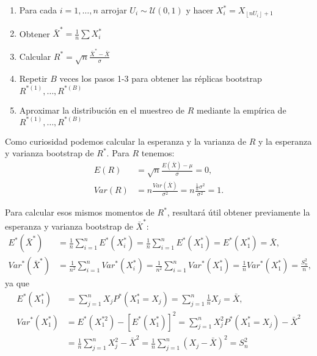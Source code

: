 \documentclass[]{book}
\theoremstyle{break}
\theoremstyle{definition}
\theoremstyle{definition}
\theoremstyle{definition}
\theoremstyle{remark}
\begin{document}
\begin{enumerate}
\def\labelenumi{\arabic{enumi}.}
\item
  Para cada \(i=1,\ldots ,n\) arrojar
  \(U_i\sim \mathcal{U}\left( 0,1 \right)\) y hacer
  \(X_i^{\ast}=X_{\left\lfloor nU_i\right\rfloor +1}\)
\item
  Obtener \(\bar{X}^{\ast}=\frac{1}{n}\sum X_i^{\ast}\)
\item
  Calcular \(R^{\ast}=\sqrt{n}\frac{\bar{X}^{\ast}-\bar{X}}{ \sigma }\)
\item
  Repetir \(B\) veces los pasos 1-3 para obtener las réplicas bootstrap
  \(R^{\ast (1)}, \ldots, R^{\ast (B)}\)
\item
  Aproximar la distribución en el muestreo de \(R\) mediante la empírica
  de \(R^{\ast (1)}, \ldots, R^{\ast (B)}\)
\end{enumerate}

Como curiosidad podemos calcular la esperanza y la varianza de \(R\) y
la esperanza y varianza bootstrap de \(R^{\ast}\). Para \(R\) tenemos:
\[\begin{aligned}
E\left( R \right) &=\sqrt{n}\frac{E\left( \bar{X} \right) -\mu }{\sigma }
=0, \\
Var\left( R \right) &=n\frac{Var\left( \bar{X} \right)}{\sigma^2}=n
\frac{\frac{1}{n}\sigma^2}{\sigma^2}=1.
\end{aligned}\]

Para calcular esos mismos momentos de \(R^{\ast}\), resultará útil
obtener previamente la esperanza y varianza bootstrap de
\(\bar{X}^{\ast}\): \[\begin{aligned}
E^{\ast}\left( \bar{X}^{\ast} \right) &= \frac{1}{n}
\sum_{i=1}^{n}E^{\ast}\left( X_i^{\ast} \right) =\frac{1}{n}
\sum_{i=1}^{n}E^{\ast}\left( X_1^{\ast} \right) =E^{\ast}\left(
X_1^{\ast} \right) =\bar{X}, \\
Var^{\ast}\left( \bar{X}^{\ast} \right) &= \frac{1}{n^2}
\sum_{i=1}^{n}Var^{\ast}\left( X_i^{\ast} \right) =\frac{1}{n^2}
\sum_{i=1}^{n}Var^{\ast}\left( X_1^{\ast} \right) =\frac{1}{n}Var^{\ast
}\left( X_1^{\ast} \right) =\frac{S_n^2}{n},
\end{aligned}\] ya que \[\begin{aligned}
E^{\ast}\left( X_1^{\ast} \right) &= \sum_{j=1}^{n}X_jP^{\ast}\left(
X_1^{\ast}=X_j \right) =\sum_{j=1}^{n}\frac{1}{n}X_j=\bar{X}, \\
Var^{\ast}\left( X_1^{\ast} \right) &= E^{\ast}\left( X_1^{\ast
2} \right) -\left[ E^{\ast}\left( X_1^{\ast} \right) \right]
^2=\sum_{j=1}^{n}X_j^2P^{\ast}\left( X_1^{\ast}=X_j \right) -\bar{X}
^2 \\
&= \frac{1}{n}\sum_{j=1}^{n}X_j^2-\bar{X}^2=\frac{1}{n}
\sum_{j=1}^{n}\left( X_j-\bar{X} \right)^2=S_n^2
\end{aligned}\]
\end{document}
